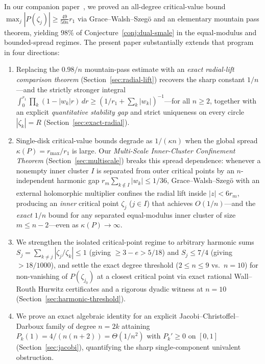 \documentclass[11pt,a4paper]{article}
\theoremstyle{definition}
\theoremstyle{remark}
\begin{document}
In our companion paper~\cite{BesevicAllN}, we proved an all-degree critical-value bound $\max_j |P(\zeta_j)| \ge \frac{49}{50n} r_1$ via Grace--Walsh--Szeg\"o and an elementary mountain pass theorem, yielding $98\%$ of Conjecture~\ref{conj:dual-smale} in the equal-modulus and bounded-spread regimes. The present paper substantially extends that program in four directions:
\begin{enumerate}
\item Replacing the $0.98/n$ mountain-pass estimate with an \emph{exact radial-lift comparison theorem} (Section~\ref{sec:radial-lift}) recovers the sharp constant $1/n$---and the strictly stronger integral $\int_0^{r_1} \prod_k (1 - |w_k|r)\, dr \ge (1/r_1 + \sum_k |w_k|)^{-1}$---for all $n \ge 2$, together with an explicit \emph{quantitative stability gap} and strict uniqueness on every circle $|\zeta_k| = R$ (Section~\ref{sec:exact-radial}).
\item Single-disk critical-value bounds degrade as $1/(\kappa n)$ when the global spread $\kappa(P) = r_{\max}/r_1$ is large. Our \emph{Multi-Scale Inner-Cluster Confinement Theorem} (Section~\ref{sec:multiscale}) breaks this spread dependence: whenever a nonempty inner cluster $I$ is separated from outer critical points by an $n$-independent harmonic gap $r_m \sum_{k \notin I} |w_k| \le 1/36$, Grace--Walsh--Szeg\"o with an external holomorphic multiplier confines the radial lift inside $|z| < 6 r_m$, producing an \emph{inner} critical point $\zeta_j$ ($j \in I$) that achieves $O(1/n)$---and the \emph{exact} $1/n$ bound for any separated equal-modulus inner cluster of size $m \le n - 2$---even as $\kappa(P) \to \infty$.
\item We strengthen the isolated critical-point regime to arbitrary harmonic sums $S_j = \sum_{k \neq j} |\zeta_j / \zeta_k| \le 1$ (giving $\ge 3 - e > 5/18$) and $S_j \le 7/4$ (giving $> 18/1000$), and settle the exact degree threshold ($2 \le n \le 9$ vs.\ $n = 10$) for non-vanishing of $P(\zeta_{j_0})$ at a closest critical point via exact rational Wall--Routh Hurwitz certificates and a rigorous dyadic witness at $n = 10$ (Section~\ref{sec:harmonic-threshold}).
\item We prove an exact algebraic identity for an explicit Jacobi--Christoffel--Darboux family of degree $n = 2k$ attaining $P_k(1) = 4/(n(n+2)) = \Theta(1/n^2)$ with $P_k' \ge 0$ on $[0, 1]$ (Section~\ref{sec:jacobi}), quantifying the sharp single-component univalent obstruction.
\end{enumerate}
\end{document}
